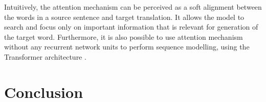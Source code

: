 \documentclass[12pt]{extarticle}
\begin{document}
Intuitively, the attention mechanism can be perceived as a soft alignment between the words in a source sentence and target translation. It allows the model to search and focus only on important information that is relevant for generation of the target word. Furthermore, it is also possible to use attention mechanism without any recurrent network units to perform sequence modelling, using the Transformer architecture \citep{NIPS2017_7181}.%











\section*{Conclusion}

\newpage

\end{document}

